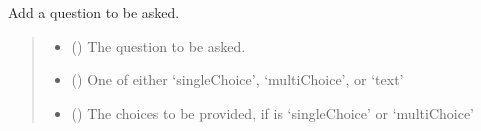 \documentclass[letterpaper,10pt,english]{sphinxmanual}
\begin{document}
\begin{fulllineitems}
\begin{fulllineitems}
\label{\detokenize{aisquared.config.feedback:aisquared.config.feedback.QualitativeFeedback.QualitativeFeedback.add_question}}
\pysigstartsignatures
{}
\pysigstopsignatures
\sphinxAtStartPar
Add a question to be asked.
\begin{quote}\begin{description}
\begin{itemize}
\item {} 
\sphinxAtStartPar
{} () \textendash{} The question to be asked.

\item {} 
\sphinxAtStartPar
{} (\sphinxstyleliteralemphasis{\sphinxupquote{ (}}\sphinxstyleliteralemphasis{\sphinxupquote{)}}) \textendash{} One of either ‘singleChoice’, ‘multiChoice’, or ‘text’

\item {} 
\sphinxAtStartPar
{} (\sphinxstyleliteralemphasis{\sphinxupquote{ (}}\sphinxstyleliteralemphasis{\sphinxupquote{ {[}}}\sphinxstyleliteralemphasis{\sphinxupquote{{]}}}\sphinxstyleliteralemphasis{\sphinxupquote{)}}) \textendash{} The choices to be provided, if  is ‘singleChoice’ or ‘multiChoice’

\end{itemize}

\end{description}\end{quote}

\end{fulllineitems}


\end{fulllineitems}
\end{document}
